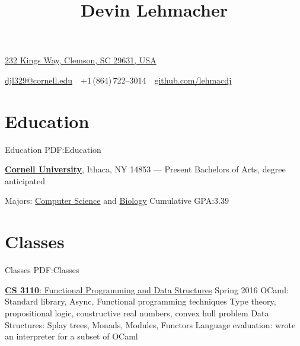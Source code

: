 \documentclass[letterpaper,10pt,oneside]{simpleresumecv}
\newcommand{\CVAuthor}{Devin Lehmacher}
\newcommand{\CVWebpage}{github.com/lehmacdj}
\begin{document}

\title{\CVAuthor}

\begin{subtitle}
\href{https://www.google.com/maps/place/232+Kings+Way,+Clemson,+SC+29631,+USA}
{232 Kings Way, Clemson, SC 29631, USA}
\par
\href{mailto:djl329@cornell.edu}
{djl329@cornell.edu}
\,\SubBulletSymbol\,
+1\,(864)\,722--3014
\,\SubBulletSymbol\,
\href{https://\CVWebpage}
{\CVWebpage}
\end{subtitle}

\begin{body}


\section%
{Education}
{Education}
{PDF:Education}

\href{https://www.cornell.edu}
{\textbf{Cornell University}},
Ithaca, NY 14853
\hfill
{} --- Present
\BulletItem%
Bachelors of Arts, degree anticipated
\begin{detail}
\SubBulletItem%
Majors:
\href{https://www.cs.cornell.edu}
{Computer Science}
and
\href{https://www.biology.cornell.edu}
{Biology}
\SubBulletItem%
Cumulative GPA:\@ 3.39
\end{detail}


\section%
{Classes}
{Classes}
{PDF:Classes}

\href{https://www.cs.cornell.edu/courses/cs3110/2016sp/}
{{\textbf{CS 3110}}: Functional Programming and Data Structures}
\hfill Spring 2016
\BulletItem%
OCaml: Standard library, Async, Functional programming techniques
\BulletItem%
Type theory, propositional logic, constructive real numbers, convex hull problem
\BulletItem%
Data Structures: Splay trees, Monads, Modules, Functors
\BulletItem%
Language evaluation: wrote an interpreter for a subset of OCaml
\GapNoBreak%


\end{body}
\end{document}
